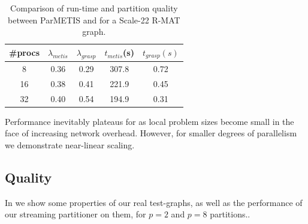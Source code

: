 \begin{table}
\caption{Comparison of run-time and partition quality between ParMETIS and \ourmethod for a Scale-22 R-MAT graph.}
\centering
\small
{ \begin{tabular}{ c | c | c | c | c  }    \toprule
\#procs & $\lambda_{metis}$ & $\lambda_{grasp}$ & $t_{metis}$(s) & $t_{grasp}(s)$ \\ \midrule
8 & 0.36 & 0.29 & 307.8 & 0.72 \\
16 & 0.38 & 0.41 & 221.9 & 0.45 \\
32 & 0.40 & 0.54 & 194.9 & 0.31 \\
\hline
\end{tabular}\par
}
\label{tab:rmatpmstrong}
\end{table}


Performance inevitably plateaus for \ourmethod as local problem sizes become small in the face of increasing network overhead. However, for smaller degrees of parallelism we demonstrate near-linear scaling. 

\subsection{Quality} \label{sec:qual}
In  we show some properties of our real test-graphs, as well as the performance of our streaming partitioner on them, for $p=2$ and $p=8$ partitions.. 

